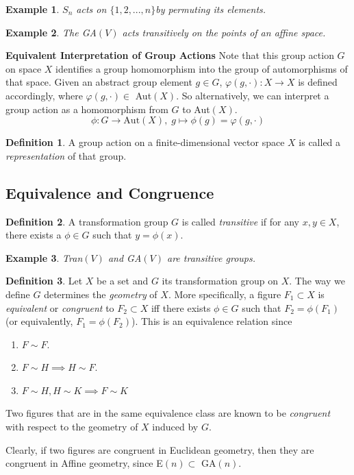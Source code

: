 \documentclass{article}
\newtheorem{example}{Example}[section]
\theoremstyle{remark}
\theoremstyle{definition}
\newtheorem{definition}{Definition}[section]
\begin{document}
\begin{example}
$S_n$ acts on $\{1, 2, ..., n\}$by permuting its elements.
\end{example}

\begin{example}
The GA$(V)$ acts transitively on the points of an affine space.
\end{example}

\textbf{Equivalent Interpretation of Group Actions}
Note that this group action $G$ on space $X$ identifies a group homomorphism into the group of automorphisms of that space. Given an abstract group element $g \in G$, $\varphi(g, \cdot): X \longrightarrow X$ is defined accordingly, where $\varphi(g, \cdot) \in $ Aut$(X)$. So alternatively, we can interpret a group action as a homomorphism from $G$ to Aut$(X)$. 
\[ \phi: G \longrightarrow \text{Aut}(X), \; g \mapsto \phi(g) = \varphi(g,\cdot)\]

\begin{definition}
A group action on a finite-dimensional vector space $X$ is called a \textit{representation} of that group. 
\end{definition}

\subsection{Equivalence and Congruence}

\begin{definition}
A transformation group $G$ is called \textit{transitive} if for any $x, y \in X$, there exists a $\phi \in G$ such that $y = \phi(x)$. 
\end{definition}

\begin{example}
Tran$(V)$ and GA$(V)$ are transitive groups. 
\end{example}

\begin{definition}
Let $X$ be a set and $G$ its transformation group on $X$. The way we define $G$ determines the \textit{geometry} of $X$. More specifically, a figure $F_{1} \subset X$ is \textit{equivalent} or \textit{congruent} to $F_{2} \subset X$ iff there exists $\phi \in G$ such that $F_{2} = \phi (F_{1})$ (or equivalently, $F_{1} = \phi (F_{2})$). This is an equivalence relation since
\begin{enumerate}
    \item $F \sim F$. 
    \item $F \sim H \implies H \sim F$. 
    \item $F \sim H, H \sim K \implies F \sim K$
\end{enumerate}
Two figures that are in the same equivalence class are known to be \textit{congruent} with respect to the geometry of $X$ induced by $G$. 
\end{definition}
Clearly, if two figures are congruent in Euclidean geometry, then they are congruent in Affine geometry, since E$(n) \subset$ GA$(n)$. 
\end{document}

